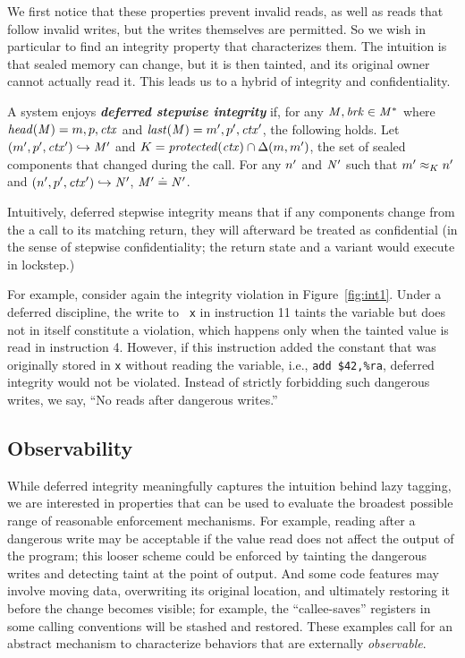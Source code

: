 \documentclass[acmsmall,review,anonymous]{acmart}\settopmatter{printfolios=true,printccs=false,printacmref=false}
\begin{document}
{{We first notice that these properties prevent invalid reads, as well as reads
that follow invalid writes, but the writes themselves are permitted.
So we wish in particular to find an integrity property that characterizes them.
The intuition is that sealed memory can change, but it is
then tainted, and its original owner cannot actually read it. This
leads us to a hybrid of integrity and confidentiality.

A system enjoys \textbf{\textit{deferred stepwise integrity}} if,
for any \(\mathit{M},\mathit{brk} \in \mathit{M}^*\) where \(\mathit{head}(\mathit{M}) = m,p,\mathit{ctx}\) and
\(\mathit{last}(\mathit{M}) = m',p',\mathit{ctx}'\), the following holds. Let
\((m',p',\mathit{ctx}') \hookrightarrow \mathit{M}'\) and
\(K = \mathit{protected}(\mathit{ctx}) \cap \Delta(m,m')\), the
set of sealed components that changed during the call.
For any \(n'\) and \(\mathit{N}'\) such that \(m' \approx_{K} n'\) and
\((n',p',\mathit{ctx}') \hookrightarrow \mathit{N}'\), \(\mathit{M}' \doteq \mathit{N}'\).

Intuitively, deferred stepwise integrity means that if any components change from
the a call to its matching return, they will afterward be treated as confidential
(in the sense of stepwise confidentiality; the return state and a variant would
execute in lockstep.)

For example, consider again the integrity violation in
Figure~\ref{fig:int1}. Under a deferred discipline, the write to {\tt
  x} in instruction 11 taints the variable but does not in itself
constitute a violation, which happens only when the tainted value is
read in instruction 4. However, if this instruction added the constant
that was originally stored in {\tt x} without reading the variable,
i.e., {\tt add \$42,\%ra}, deferred integrity would not be violated.
Instead of strictly forbidding such dangerous writes, we say,
``No reads after dangerous writes.''

\subsection{Observability}

While deferred integrity meaningfully captures the intuition
behind lazy tagging, we are interested in properties that can be used to
evaluate the broadest possible range of reasonable
enforcement mechanisms.
For example, reading after a dangerous write may be acceptable if the value
read does not affect the output of the program; this looser scheme
could be enforced by tainting the dangerous writes and detecting taint
at the point of output.
And some code features may involve moving data, overwriting its original location,
and ultimately restoring it before the change becomes visible; for example, the
``callee-saves'' registers in some calling conventions will be stashed and restored.
These examples call for an abstract mechanism to characterize behaviors that are externally
\emph{observable}.

}}
\end{document}
